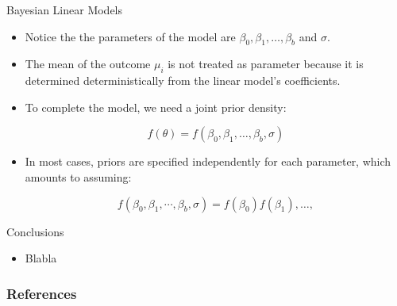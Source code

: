 \documentclass[handout]{beamer}
\begin{document}
\begin{frame}{Bayesian Linear Models}
\scriptsize{
\begin{itemize}


\item Notice the the parameters of the model are $\beta_0,\beta_1,\dots,\beta_b$ and $\sigma$.

\item The mean of the outcome $\mu_i$ is not treated as parameter because it is determined deterministically from the linear model's coefficients.

\item To complete the model, we need a joint prior density:

\begin{displaymath}
f(\theta)= f(\beta_0,\beta_1,\dots,\beta_b,\sigma)
\end{displaymath}






\item In most cases, priors are specified independently for each parameter, which amounts to assuming:


\begin{displaymath}
f(\beta_0,\beta_1,\cdots,\beta_b,\sigma)=f(\beta_0)f(\beta_1),\dots, 
\end{displaymath}



\cite{mcelreath2020statistical}



 
\end{itemize}



} 

\end{frame}


\begin{frame}{Conclusions}
\scriptsize{

\begin{itemize}
\item Blabla
\end{itemize}


} 
\end{frame}


\begin{frame}[allowframebreaks]\scriptsize
\frametitle{References}


%
\end{frame}  









\end{document}
